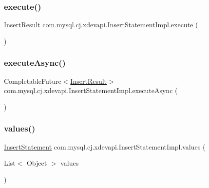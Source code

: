 \subsubsection{\texorpdfstring{execute()}{execute()}}
{\footnotesize\ttfamily \mbox{\hyperlink{interfacecom_1_1mysql_1_1cj_1_1xdevapi_1_1_insert_result}{Insert\+Result}} com.\+mysql.\+cj.\+xdevapi.\+Insert\+Statement\+Impl.\+execute (\begin{DoxyParamCaption}{ }\end{DoxyParamCaption})}

\mbox{\label{classcom_1_1mysql_1_1cj_1_1xdevapi_1_1_insert_statement_impl_a4785f26555304b8f166252956daebda1}} 
\subsubsection{\texorpdfstring{execute\+Async()}{executeAsync()}}
{\footnotesize\ttfamily Completable\+Future$<$\mbox{\hyperlink{interfacecom_1_1mysql_1_1cj_1_1xdevapi_1_1_insert_result}{Insert\+Result}}$>$ com.\+mysql.\+cj.\+xdevapi.\+Insert\+Statement\+Impl.\+execute\+Async (\begin{DoxyParamCaption}{ }\end{DoxyParamCaption})}

\mbox{\label{classcom_1_1mysql_1_1cj_1_1xdevapi_1_1_insert_statement_impl_a22848b1b53273551d2c4ce65e2c237de}} 
\subsubsection{\texorpdfstring{values()}{values()}}
{\footnotesize\ttfamily \mbox{\hyperlink{interfacecom_1_1mysql_1_1cj_1_1xdevapi_1_1_insert_statement}{Insert\+Statement}} com.\+mysql.\+cj.\+xdevapi.\+Insert\+Statement\+Impl.\+values (\begin{DoxyParamCaption}\item[{List$<$ Object $>$}]{values }\end{DoxyParamCaption})}


